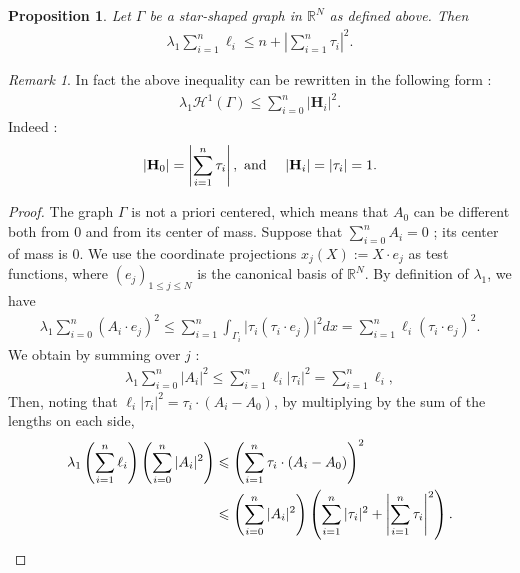 \documentclass[12pt,english]{smfart} %
\newtheorem{proposition}[theorem]{Proposition}
\theoremstyle{remark}
\newtheorem{remark}[theorem]{Remark}
\begin{document}
\medskip\begin{proposition}\label{Reillygraphetoile}
	Let $\Gamma$ be a star-shaped graph in $\mathbb{R}^N$ as defined above. Then 
	\begin{align*}
		\lambda_1 \sum_{i=1}^n \ell_i \leqslant n + \left\vert \sum_{i=1}^n \tau_i \right\vert^2.
	\end{align*}
\end{proposition}
\begin{remark} In fact the above inequality can be rewritten in the following form :
\begin{align*}
		\lambda_1 \mathcal{H}^1(\Gamma) \leqslant \sum_{i=0}^n\vert \mathbf{H}_i \vert^2.
	\end{align*}
Indeed : 
	\begin{align*}
		\vert \mathbf{H}_0 \vert =\left\vert \sum_{i=1}^n \tau_i \right\vert, \textnormal{ and }\quad \vert \mathbf{H}_i \vert = \vert \tau_i \vert = 1.
	\end{align*}
\end{remark}
\begin{proof}
	The graph $\Gamma$ is not a priori centered, which means that $A_0$ can be different both from 0 and from its center of mass. Suppose that $\sum_{i=0}^nA_i=0$ ; its center of mass is $0$. We use the coordinate projections $x_j(X):= X \cdot e_j$ as test functions, where $(e_j)_{1\leqslant j \leqslant N}$ is the canonical basis of $\mathbb{R}^N$. By definition of $\lambda_1$, we have
	\begin{align*}
		\lambda_1 \sum_{i=0}^n(A_i \cdot e_j)^2 \leqslant \sum_{i=1}^n\int_{\Gamma_i}\vert \tau_i(\tau_i \cdot e_j)\vert^2 dx = \sum_{i=1}^n \ell_i (\tau_i \cdot e_j)^2.
	\end{align*}
	We obtain by summing over $j$ :
	\begin{align*}
		\lambda_1 \sum_{i=0}^n \vert A_i \vert^2 \leqslant \sum_{i=1}^n \ell_i \vert \tau_i \vert^2 = \sum_{i=1}^n\ell_i,
	\end{align*}
	Then, noting that $\ell_i \vert \tau_i \vert^2 = \tau_i \cdot (A_i-A_0)$, by multiplying by the sum of the lengths on each side, 
	\begin{align}\label{holderreillyetoile}
		\lambda_1\left(\sum_{i=1}^n\ell_i\right)\left(\sum_{i=0}^n \vert A_i \vert^2\right) &\leqslant \left(\sum_{i=1}^n \tau_i\cdot (A_i-A_0)\right)^2 \notag \\&\leqslant \left( \sum_{i=0}^n \vert A_i\vert^2\right)\left(\sum_{i=1}^n\vert \tau_i \vert^2 + \left\vert \sum_{i=1}^n \tau_i \right\vert^2\right).
	\end{align}
\end{proof}
\end{document}
